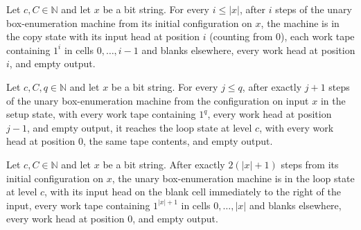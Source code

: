 \begin{lemma}
\label{Complexity.poly_copy}
\leanok
{}
Let $c,C\in\mathbb{N}$ and let $x$ be a bit string. For every $i\le |x|$, after $i$
steps of the unary box-enumeration machine from its initial configuration on $x$, the
machine is in the copy state with its input head at position $i$ (counting from $0$),
each work tape containing $1^i$ in cells $0,\ldots,i-1$ and blanks elsewhere, every work
head at position $i$, and empty output.
\end{lemma}

\begin{lemma}
\label{Complexity.poly_setup}
\leanok
{}
Let $c,C,q\in\mathbb{N}$ and let $x$ be a bit string. For every $j\le q$, after exactly
$j+1$ steps of the unary box-enumeration machine from the configuration on input $x$ in
the setup state, with every work tape containing $1^q$, every work head at position
$j-1$, and empty output, it reaches the loop state at level $c$, with every work head at
position $0$, the same tape contents, and empty output.
\end{lemma}

\begin{lemma}
\label{Complexity.poly_start}
\leanok
{}
Let $c,C\in\mathbb{N}$ and let $x$ be a bit string. After exactly $2(|x|+1)$ steps from
its initial configuration on $x$, the unary box-enumeration machine is in the loop state
at level $c$, with its input head on the blank cell immediately to the right of the
input, every work tape containing $1^{|x|+1}$ in cells $0,\ldots,|x|$ and blanks
elsewhere, every work head at position $0$, and empty output.
\end{lemma}

